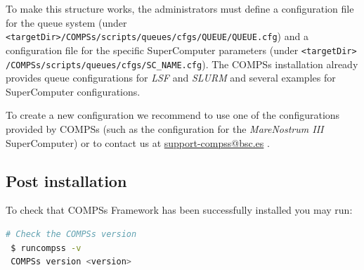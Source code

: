 To make this structure works, the administrators must define a configuration file for the queue system 
(under \verb|<targetDir>/COMPSs/scripts/queues/cfgs/QUEUE/QUEUE.cfg|) and a configuration file for the specific SuperComputer parameters
(under \verb|<targetDir>| \verb|/COMPSs/scripts/queues/cfgs/SC_NAME.cfg|). The COMPSs installation already provides queue configurations 
for \textit{LSF} and \textit{SLURM} and several examples for SuperComputer configurations. 

To create a new configuration we recommend to use one of the configurations provided by COMPSs (such as the configuration for the
\textit{MareNostrum III} SuperComputer) or to contact us at \url{support-compss@bsc.es} .

\subsection{Post installation}
To check that COMPSs Framework has been successfully installed you may run:
\begin{lstlisting}[language=bash]
 # Check the COMPSs version
 $ runcompss -v
 COMPSs version <version>
\end{lstlisting}

